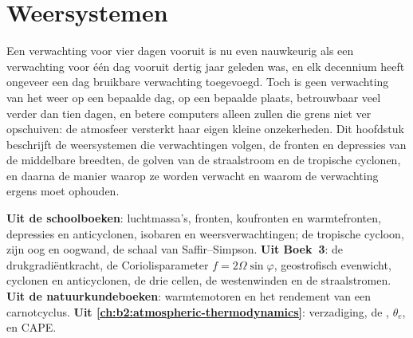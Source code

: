 \chapter{Weersystemen}\label{ch:b2:weather-systems}

Een verwachting voor vier dagen vooruit is nu even nauwkeurig als een verwachting voor één dag vooruit dertig
jaar geleden was, en elk decennium heeft ongeveer een dag bruikbare verwachting toegevoegd. Toch is geen verwachting van het
weer op een bepaalde dag, op een bepaalde plaats, betrouwbaar veel verder dan tien dagen, en betere computers
alleen zullen die grens niet ver opschuiven: de atmosfeer versterkt haar eigen kleine onzekerheden. Dit
hoofdstuk beschrijft de weersystemen die verwachtingen volgen, de fronten en depressies van de
middelbare breedten, de golven van de straalstroom en de tropische cyclonen, en daarna de manier waarop ze
worden verwacht en waarom de verwachting ergens moet ophouden.

\begin{recall}
\textbf{Uit de schoolboeken}: luchtmassa's, fronten, koufronten en warmtefronten, depressies en
anticyclonen, isobaren en weersverwachtingen; de tropische cycloon, zijn oog en oogwand, de
schaal van Saffir--Simpson. \textbf{Uit Boek~3}: de drukgradiëntkracht, de
Coriolisparameter $f = 2\Omega\sin\varphi$, geostrofisch evenwicht, cyclonen en anticyclonen, de
drie cellen, de westenwinden en de straalstromen. \textbf{Uit de natuurkundeboeken}: warmtemotoren
en het rendement van een carnotcyclus. \textbf{Uit \cref{ch:b2:atmospheric-thermodynamics}}:
verzadiging, de , $\theta_e$,  en CAPE.
\end{recall}

